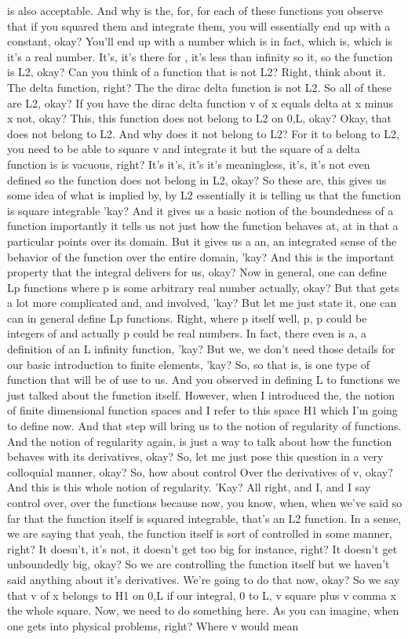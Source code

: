 \documentclass[10pt]{article}
\begin{document}
is also acceptable. And why is the, for, for each of these functions you observe that if you squared them and integrate them, you will essentially end up with a constant, okay? You'll end up with a number which is in fact, which is, which is it's a real number. It's, it's there for , it's less than infinity so it, so the function is L2, okay? Can you think of a function that is not L2? Right, think about it. The delta function, right? The the dirac delta function is not L2. So all of these are L2, okay? If you have the dirac delta function v of x equals delta at x minus x not, okay? This, this function does not belong to L2 on 0,L, okay? Okay, that does not belong to L2. And why does it not belong to L2? For it to belong to L2, you need to be able to square v and integrate it but the square of a delta function is is vacuous, right? It's it's, it's it's meaningless, it's, it's not even defined so the function does not belong in L2, okay? So these are, this gives us some idea of what is implied by, by L2 essentially it is telling us that the function is square integrable 'kay? And it gives us a basic notion of the boundedness of a function importantly it tells us not just how the function behaves at, at in that a particular points over its domain. But it gives us a an, an integrated sense of the behavior of the function over the entire domain, 'kay? And this is the important property that the integral delivers for us, okay? Now in general, one can define Lp functions where p is some arbitrary real number actually, okay? But that gets a lot more complicated and, and involved, 'kay? But let me just state it, one can can in general define Lp functions. Right, where p itself well, p, p could be integers of and actually p could be real numbers. In fact, there even is a, a definition of an L infinity function, 'kay? But we, we don't need those details for our basic introduction to finite elements, 'kay? So, so that is, is one type of function that will be of use to us. And you observed in defining L to functions we just talked about the function itself. However, when I introduced the, the notion of finite dimensional function spaces and I refer to this space H1 which I'm going to define now. And that step will bring us to the notion of regularity of functions. And the notion of regularity again, is just a way to talk about how the function behaves with its derivatives, okay? So, let me just pose this question in a very colloquial manner, okay? So, how about control Over the derivatives of v, okay? And this is this whole notion of regularity. 'Kay? All right, and I, and I say control over, over the functions because now, you know, when, when we've said so far that the function itself is squared integrable, that's an L2 function. In a sense, we are saying that yeah, the function itself is sort of controlled in some manner, right? It doesn't, it's not, it doesn't get too big for instance, right? It doesn't get unboundedly big, okay? So we are controlling the function itself but we haven't said anything about it's derivatives. We're going to do that now, okay? So we say that v of x belongs to H1 on 0,L if our integral, 0 to L, v square plus v comma x the whole square. Now, we need to do something here. As you can imagine, when one gets into physical problems, right? Where v would mean 
\end{document}

